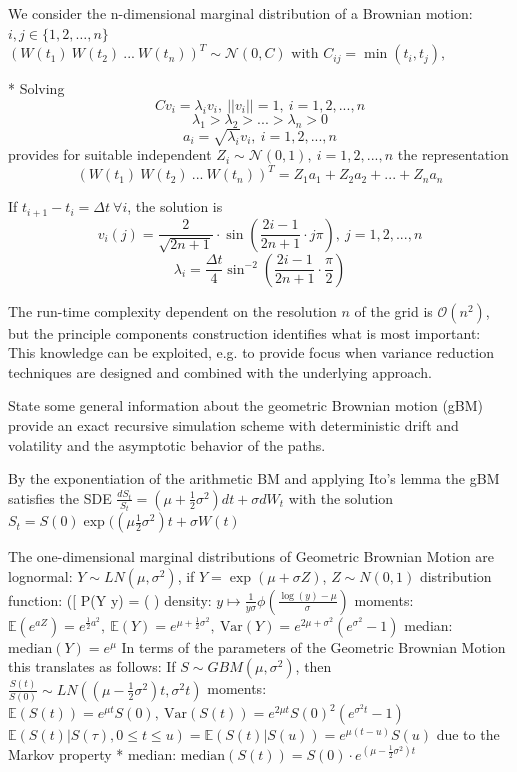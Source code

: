 We consider the n-dimensional marginal distribution of a Brownian motion:
\( i, j \in \{1, 2, \dots, n\}   \)
\( (W(t_1) \ W(t_2) \ ... \ W(t_n))^T \sim \mathcal{N}(0, C) \text{ with } C_{ij} = \min(t_i, t_j), \ \)

* Solving 
\[ Cv_i = \lambda_i v_i, \ ||v_i|| = 1, \ i = 1, 2, ..., n \]
\[ \lambda_1 > \lambda_2 > ... > \lambda_n > 0 \]
\[ a_i = \sqrt{\lambda_i} v_i, \ i = 1, 2, ..., n \]
provides for suitable independent \( Z_i \sim \mathcal{N}(0,1), \ i = 1, 2, ..., n \) the representation
\[ (W(t_1) \ W(t_2) \ ... \ W(t_n))^T = Z_1 a_1 + Z_2 a_2 + ... + Z_n a_n \]

If \( t_{i+1} - t_i = \Delta t \ \forall i \), the solution is
\[ v_i(j) = \frac{2}{\sqrt{2n+1}} \cdot \sin \left( \frac{2i-1}{2n+1} \cdot j \pi \right), \ j = 1, 2, ..., n \]
\[ \lambda_i = \frac{\Delta t}{4} \sin^{-2} \left( \frac{2i-1}{2n+1} \cdot \frac{\pi}{2} \right) \]

The run-time complexity dependent on the resolution \( n \) of the grid is \( \mathcal{O}(n^{2}) \),
but the principle components construction identifies what is most important:
This knowledge can be exploited, e.g. to provide focus when variance reduction techniques are designed and
combined with the underlying approach.

State some general information about the geometric Brownian motion (gBM)
provide an exact recursive simulation scheme with deterministic drift and volatility
and the asymptotic behavior of the paths.

By the exponentiation of the arithmetic BM and applying Ito's lemma
the gBM satisfies the SDE
\( \frac{dS_t}{S_t} = (\mu + \frac{1}{2}\sigma^2)dt + \sigma dW_t \)
with the solution \( S_t = S(0)\exp((\mu \frac{1}{2}\sigma^2)t + \sigma W(t) \)

The one-dimensional marginal distributions of Geometric Brownian Motion are lognormal:
\(Y \sim LN(\mu, \sigma^2)\), if \(Y = \exp(\mu + \sigma Z)\), \(Z \sim N(0,1)\)
distribution function: 
([ P(Y \le y) = \Phi \left(  \right) \]
 density: \( y \mapsto \frac{1}{y \sigma} \phi \left( \frac{\log(y) - \mu}{\sigma} \right) \)
 moments: 
\( \mathbb{E}(e^{aZ}) = e^{\frac{1}{2} a^2}, \ \mathbb{E}(Y) = e^{\mu + \frac{1}{2} \sigma^2}, \ \text{Var}(Y) = e^{2\mu + \sigma^2} (e^{\sigma^2} - 1) \)
median: \(\text{median}(Y) = e^\mu\)
In terms of the parameters of the Geometric Brownian Motion this translates as follows:
If \(S \sim GBM(\mu, \sigma^2)\), then \(\frac{S(t)}{S(0)} \sim LN((\mu - \frac{1}{2} \sigma^2)t, \sigma^2 t)\)
moments: \(\mathbb{E}(S(t)) = e^{\mu t} S(0), \ \text{Var}(S(t)) = e^{2 \mu t} S(0)^2 (e^{\sigma^2 t} - 1)\)
\( \mathbb{E}(S(t) | S(\tau), 0 \le t \le u) = \mathbb{E}(S(t) | S(u)) = e^{\mu (t - u)} S(u) \) due to the Markov property
* median: \(\text{median}(S(t)) = S(0) \cdot e^{(\mu - \frac{1}{2} \sigma^2)t} \)


